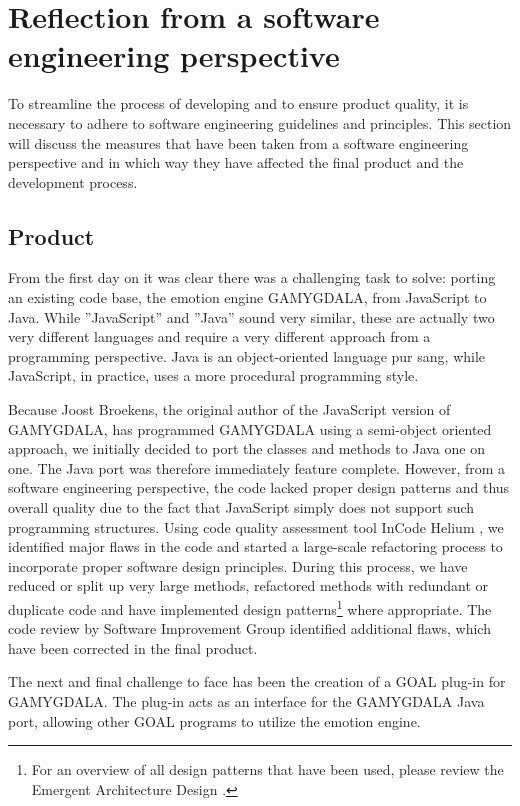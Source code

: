\section{Reflection from a software engineering perspective}
To streamline the process of developing and to ensure product quality, it is necessary to adhere to software engineering guidelines and principles. This section will discuss the measures that have been taken from a software engineering perspective and in which way they have affected the final product and the development process.


\subsection{Product}
From the first day on it was clear there was a challenging task to solve: porting an existing code base, the emotion engine GAMYGDALA, from JavaScript to Java. While ''JavaScript'' and ''Java'' sound very similar, these are actually two very different languages and require a very different approach from a programming perspective. Java is an object-oriented language pur sang, while JavaScript, in practice, uses a more procedural programming style.

Because Joost Broekens, the original author of the JavaScript version of GAMYGDALA, has programmed GAMYGDALA using a semi-object oriented approach, we initially decided to port the classes and methods to Java one on one. The Java port was therefore immediately feature complete. However, from a software engineering perspective, the code lacked proper design patterns and thus overall quality due to the fact that JavaScript simply does not support such  programming structures. Using code quality assessment tool InCode Helium \citep{incode}, we identified major flaws in the code and started a large-scale refactoring process to incorporate proper software design principles. During this process, we have reduced or split up very large methods, refactored methods with redundant or duplicate code and have implemented design patterns\footnote{For an overview of all design patterns that have been used, please review the Emergent Architecture Design \citep{ead}.} where appropriate. The code review by Software Improvement Group \citep{SIG} identified additional flaws, which have been corrected in the final product.

The next and final challenge to face has been the creation of a GOAL \citep{goal} plug-in for GAMYGDALA. The plug-in acts as an interface for the GAMYGDALA Java port, allowing other GOAL programs to utilize the emotion engine.

